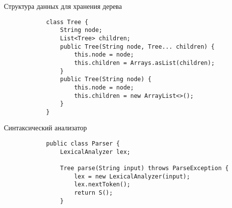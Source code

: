 \documentclass[12pt]{article}
\begin{document}
\begin{itemize}
		Структура данных для хранения дерева
		\begin{verbatim}
			class Tree {
			    String node;
			    List<Tree> children;
			    public Tree(String node, Tree... children) {
			        this.node = node;
			        this.children = Arrays.asList(children);
			    }
			    public Tree(String node) {
			        this.node = node;
			        this.children = new ArrayList<>();
			    }
			}
		\end{verbatim}

		Синтаксический анализатор

		\begin{verbatim}
			public class Parser {
			    LexicalAnalyzer lex;
			
			    Tree parse(String input) throws ParseException {
			        lex = new LexicalAnalyzer(input);
			        lex.nextToken();
			        return S();
			    }
			

\end{verbatim}
\end{itemize}
\end{document}
